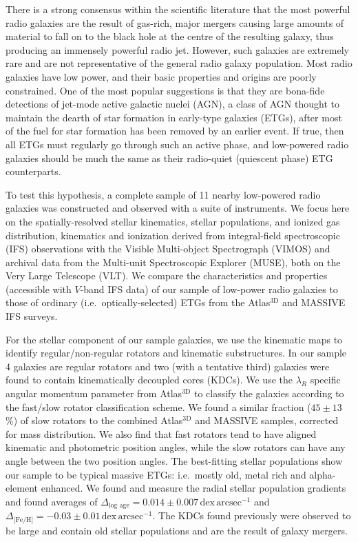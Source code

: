 \begin{abstractlong}
There is a strong consensus within the scientific literature that the most powerful radio galaxies are the result of gas-rich, major mergers causing large amounts of material to fall on to the black hole at the centre of the resulting galaxy, thus producing an immensely powerful radio jet. However, such galaxies are extremely rare and are not representative of the general radio galaxy population. Most radio galaxies have low power, and their basic properties and origins are poorly constrained. One of the most popular suggestions is that they are bona-fide detections of jet-mode active galactic nuclei (AGN), a class of AGN thought to maintain the dearth of star formation in early-type galaxies (ETGs), after most of the fuel for star formation has been removed by an earlier event. If true, then all ETGs must regularly go through such an active phase, and low-powered radio galaxies should be much the same as their radio-quiet (quiescent phase) ETG counterparts. 

To test this hypothesis, a complete sample of 11 nearby low-powered radio galaxies was constructed and observed with a suite of instruments. We focus here on the spatially-resolved stellar kinematics, stellar populations, and ionized gas distribution, kinematics and ionization derived from integral-field spectroscopic (IFS) observations with the Visible Multi-object Spectrograph (VIMOS) and archival data from the Multi-unit Spectroscopic Explorer (MUSE), both on the Very Large Telescope (VLT). We compare the characteristics and properties (accessible with $V$-band IFS data) of our sample of low-power radio galaxies to those of ordinary (i.e.\ optically-selected) ETGs from the Atlas$^\text{3D}$ and MASSIVE IFS surveys.

For the stellar component of our sample galaxies, we use the kinematic maps to identify regular/non-regular rotators and kinematic substructures. In our sample 4 galaxies are regular rotators and two (with a tentative third) galaxies were found to contain kinematically decoupled cores (KDCs). We use the $\lambda_R$ specific angular momentum parameter from Atlas$^\text{3D}$ to classify the galaxies according to the fast/slow rotator classification scheme. We found a similar fraction ($45\pm13$\%) of slow rotators to the combined Atlas$^\text{3D}$ and MASSIVE samples, corrected for mass distribution. We also find that fast rotators tend to have aligned kinematic and photometric position angles, while the slow rotators can have any angle between the two position angles. The best-fitting stellar populations show our sample to be typical massive ETGs: i.e.\ mostly old, metal rich and alpha-element enhanced. We found and measure the radial stellar population gradients and found averages of $\Delta_\text{log age} = 0.014\pm0.007 \,\mathrm{dex \, arcsec^{-1}}$ and $\Delta_\text{[Fe/H]} = -0.03\pm0.01 \, \mathrm{dex \, arcsec^{-1}}$. The KDCs found previously were observed to be large and contain old stellar populations and are the result of galaxy mergers. 


\end{abstractlong}
